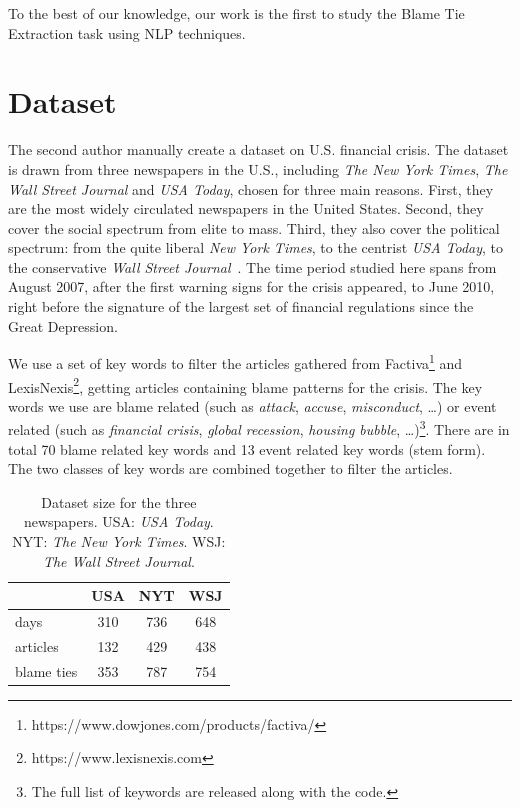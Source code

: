 \documentclass[letterpaper]{article} %
\begin{document}
To the best of our knowledge, our work is the first to study the Blame Tie Extraction task using NLP techniques.

\section{Dataset}
\label{dataset}
The second author manually create a dataset on U.S. financial crisis. The dataset is drawn from three newspapers in the U.S., including {\it The New York Times}, {\it The Wall Street Journal} and {\it USA Today}, chosen for three main reasons. First, they are the most widely circulated newspapers in the United States. Second, they cover the social spectrum from elite to mass. Third, they also cover the political spectrum: from the quite liberal {\it New York Times}, to the centrist {\it USA Today}, to the conservative {\it Wall Street Journal}~\cite{gentzkow2010drives,groseclose2005measure}. The time period studied here spans from August 2007, after the first warning signs for the crisis appeared, to June 2010, right before the signature of the largest set of financial regulations since the Great Depression.

We use a set of key words to filter the articles gathered from Factiva\footnote{https://www.dowjones.com/products/factiva/} and LexisNexis\footnote{https://www.lexisnexis.com}, getting articles containing blame patterns for the crisis. The key words we use are blame related (such as {\it attack}, {\it accuse}, {\it misconduct}, \ldots) or event related (such as {\it financial crisis}, {\it global recession}, {\it housing bubble}, \ldots)\footnote{The full list of keywords are released along with the code.}. There are in total 70 blame related key words and 13 event related key words (stem form). The two classes of key words are combined together to filter the articles.

\begin{table}[t!]
\centering
\begin{tabular}{l c c c} 
 \hline
 & {\bf USA} &  {\bf NYT}  & {\bf WSJ} \\ 
 \hline\hline
 days & 310 & 736 & 648 \\ 
 articles & 132 & 429 & 438 \\
 blame ties & 353 & 787 & 754 \\
 \hline
\end{tabular}
\caption{Dataset size for the three newspapers. USA: {\it USA Today}. NYT: {\it The New York Times}. WSJ: {\it The Wall Street Journal}.}
\label{table:dataset}
\end{table}
\end{document}
